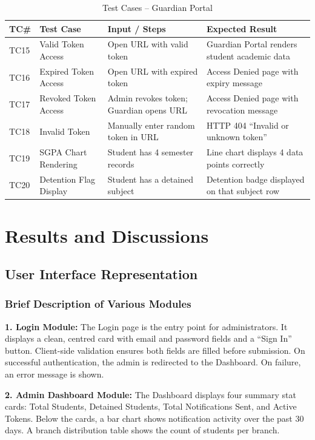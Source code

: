 \documentclass[12pt,a4paper]{report}
\begin{document}
\begin{table}[H]
\centering
\caption{Test Cases -- Guardian Portal}
\renewcommand{\arraystretch}{1.3}
\begin{tabular}{|p{0.8cm}|p{3cm}|p{4cm}|p{4.5cm}|}
\hline
\textbf{TC\#} & \textbf{Test Case} & \textbf{Input / Steps} & \textbf{Expected Result}\\
\hline
TC15 & Valid Token Access & Open URL with valid token & Guardian Portal renders student academic data\\
\hline
TC16 & Expired Token Access & Open URL with expired token & Access Denied page with expiry message\\
\hline
TC17 & Revoked Token Access & Admin revokes token; Guardian opens URL & Access Denied page with revocation message\\
\hline
TC18 & Invalid Token & Manually enter random token in URL & HTTP 404 ``Invalid or unknown token''\\
\hline
TC19 & SGPA Chart Rendering & Student has 4 semester records & Line chart displays 4 data points correctly\\
\hline
TC20 & Detention Flag Display & Student has a detained subject & Detention badge displayed on that subject row\\
\hline
\end{tabular}
\end{table}

\chapter{Results and Discussions}

\section{User Interface Representation}

\subsection{Brief Description of Various Modules}

\textbf{1. Login Module:} The Login page is the entry point for administrators. It displays a clean, centred card with email and password fields and a ``Sign In'' button. Client-side validation ensures both fields are filled before submission. On successful authentication, the admin is redirected to the Dashboard. On failure, an error message is shown.

\textbf{2. Admin Dashboard Module:} The Dashboard displays four summary stat cards: Total Students, Detained Students, Total Notifications Sent, and Active Tokens. Below the cards, a bar chart shows notification activity over the past 30 days. A branch distribution table shows the count of students per branch.
\end{document}

